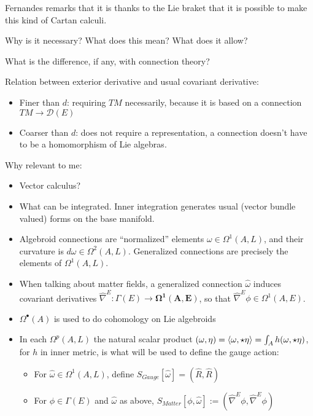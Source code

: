 Fernandes remarks that it is thanks to the Lie braket that it is possible to make this kind of Cartan calculi.

Why is it necessary? What does this mean? What does it allow?

What is the difference, if any, with connection theory?

Relation between exterior derivative and usual covariant derivative:
    \begin{itemize}
    
    \item Finer than $d$: requiring $TM$ necessarily, because it is based on a connection $TM \to \mathcal D(E)$
    
    \item Coarser than $d$: does not require a representation, a connection doesn't have to be a homomorphism of Lie algebras.
        
    \end{itemize}

Why relevant to me:
    \begin{itemize}
        
    \item Vector calculus?
    
    \item What can be integrated. Inner integration generates usual (vector bundle valued) forms on the base manifold.
    
    \item Algebroid connections are ``normalized'' elements $ \omega \in \Omega^1(A, L)$, and their curvature is $d\omega \in \Omega^2(A, L)$. Generalized connections are precisely the elements of $\Omega^1(A, L)$.
    
    \item When talking about matter fields, a generalized connection $\hat \omega$ induces covariant derivatives $\hat \nabla^E: \Gamma(E) \to \mathbf{\Omega^1(A, E)}$, so that $\hat \nabla^E \phi \in \Omega^1(A, E)$.
    
    \item $\Omega^\bullet(A)$ is used to do cohomology on Lie algebroids
    
    \item In each $\Omega^p(A, L)$ the natural scalar product $(\omega, \eta) = \left\langle \omega, \star \eta \right\rangle = \int_A h(\omega, \star \eta)$, for $h$ in inner metric, is what will be used to define the gauge action:
        
        \begin{itemize}
            
        \item For $\hat \omega \in \Omega^1(A, L)$, define $S_{Gauge}[\hat \omega] = (\hat R, \hat R)$
        
        \item For $\phi \in \Gamma(E)$ and $\hat \omega$ as above, $S_{Matter}[\phi, \hat \omega] := (\hat \nabla^E \phi, \hat \nabla^E \phi)$
        
        \end{itemize}
        
    \end{itemize}


